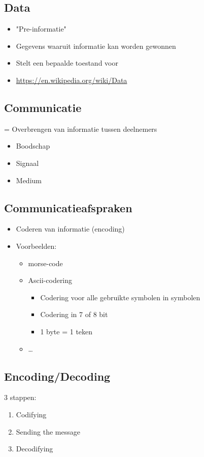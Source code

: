 \documentclass{article}
\begin{document}
\subsection{Data}
\begin{itemize}
    \item "Pre-informatie"
    \item Gegevens waaruit informatie kan worden gewonnen
    \item Stelt een bepaalde toestand voor
    \item \url{https://en.wikipedia.org/wiki/Data}
\end{itemize}

\subsection{Communicatie}
= Overbrengen van informatie tussen deelnemers
\begin{itemize}
    \item Boodschap
    \item Signaal
    \item Medium
\end{itemize}

\subsection{Communicatieafspraken}
\begin{itemize}
    \item Coderen van informatie (encoding)
    \item Voorbeelden:
    \begin{itemize}
        \item morse-code
        \item Ascii-codering
        \begin{itemize}
            \item Codering voor alle gebruikte symbolen in symbolen
            \item Codering in 7 of 8 bit
            \item 1 byte = 1 teken
        \end{itemize}
        \item \dots
    \end{itemize}
\end{itemize}
  
\subsection{Encoding/Decoding}
3 stappen:
\begin{enumerate}
    \item Codifying
    \item Sending the message
    \item Decodifying
\end{enumerate}
\end{document}
